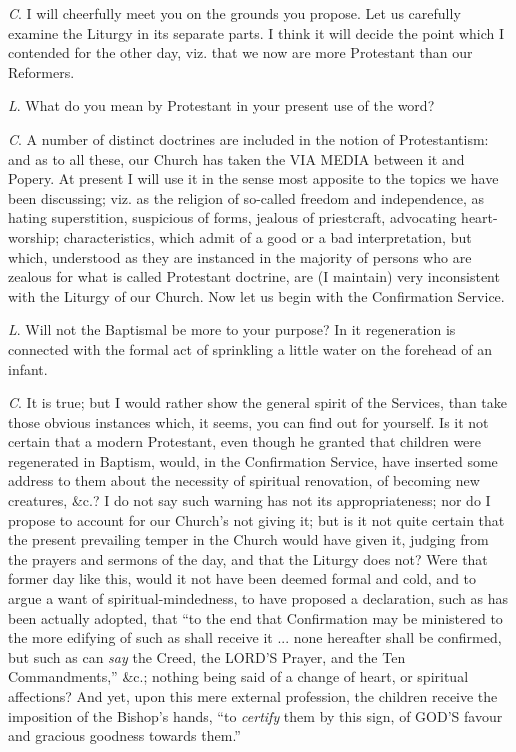 \emph{C}. I will cheerfully meet you on the
grounds you propose. Let us carefully examine the Liturgy in its
separate parts. I think it will decide the point which I contended for
the other day, viz. that we now are more Protestant than our
Reformers.

\emph{L}. What do you mean by Protestant in your
present use of the word?

\emph{C}. A number of distinct doctrines are
included in the notion of Protestantism: and as to all these, our
Church has taken the VIA MEDIA
between it and Popery. At present I will use it in the sense most
apposite to the topics we have been discussing; viz. as the religion
of so-called freedom and independence, as hating superstition,
suspicious of forms, jealous of priestcraft, advocating heart-worship;
characteristics, which admit of a good or a bad interpretation,
but which, understood as they are instanced in the majority of persons
who are zealous for what is called Protestant doctrine, are (I
maintain) very inconsistent with the Liturgy of our Church. Now let us
begin with the Confirmation Service.

\emph{L}. Will not the Baptismal be more to your
purpose? In it regeneration is connected with the formal act of
sprinkling a little water on the forehead of an infant.

\emph{C}. It is true; but I would rather show the
general spirit of the Services, than take those obvious instances
which, it seems, you can find out for yourself. Is it not certain that
a modern Protestant, even though he granted that children were
regenerated in Baptism, would, in the Confirmation Service, have
inserted some address to them about the necessity of spiritual
renovation, of becoming new creatures, \&c.? I do not say such
warning has not its appropriateness; nor do I propose to account for
our Church's not giving it; but is it not quite certain that the
present prevailing temper in the Church would have given it, judging
from the prayers and sermons of the day, and that the Liturgy does
not? Were that former day like this, would it not have been deemed
formal and cold, and to argue a want of spiritual-mindedness, to have
proposed a declaration, such as has been actually adopted, that ``to
the end that Confirmation may be ministered to the more edifying of
such as shall receive it ... none hereafter shall be confirmed, but
such as can \emph{say} the Creed, the LORD'S
Prayer, and the Ten Commandments,'' \&c.; nothing being said of a
change of heart, or spiritual affections? And yet, upon this mere
external profession, the children receive the imposition of the Bishop's
hands, ``to \emph{certify} them by this sign, of GOD'S
favour and gracious goodness towards them.''

